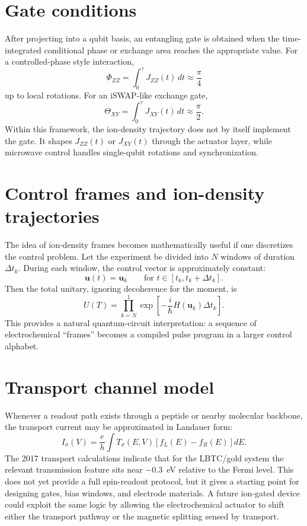\documentclass[11pt]{report}
\newcommand{\lbtc}{LBTC}
\theoremstyle{definition}
\begin{document}
\section{Gate conditions}
After projecting into a qubit basis, an entangling gate is obtained when the time-integrated conditional phase or exchange area reaches the appropriate value. For a controlled-phase style interaction,
\begin{equation}
\Phi_{ZZ} = \int_0^\tau J_{ZZ}(t)\, dt \approx \frac{\pi}{4}
\end{equation}
up to local rotations. For an iSWAP-like exchange gate,
\begin{equation}
\Theta_{XY} = \int_0^\tau J_{XY}(t)\, dt \approx \frac{\pi}{2}.
\end{equation}
Within this framework, the ion-density trajectory does not by itself implement the gate. It shapes $J_{ZZ}(t)$ or $J_{XY}(t)$ through the actuator layer, while microwave control handles single-qubit rotations and synchronization.

\section{Control frames and ion-density trajectories}
The idea of ion-density frames becomes mathematically useful if one discretizes the control problem. Let the experiment be divided into $N$ windows of duration $\Delta t_k$. During each window, the control vector is approximately constant:
\[
\mathbf{u}(t) = \mathbf{u}_k \qquad \text{for } t \in [t_k, t_k+\Delta t_k].
\]
Then the total unitary, ignoring decoherence for the moment, is
\[
U(T) = \prod_{k=N}^{1} \exp\left[-\frac{i}{\hbar}H(\mathbf{u}_k)\Delta t_k\right].
\]
This provides a natural quantum-circuit interpretation: a sequence of electrochemical ``frames'' becomes a compiled pulse program in a larger control alphabet.

\section{Transport channel model}
Whenever a readout path exists through a peptide or nearby molecular backbone, the transport current may be approximated in Landauer form:
\begin{equation}
I_\sigma(V) = \frac{e}{h}\int T_\sigma(E,V)\left[f_L(E)-f_R(E)\right]dE.
\end{equation}
The 2017 transport calculations indicate that for the \lbtc{}/gold system the relevant transmission feature sits near $-0.3$~eV relative to the Fermi level. This does not yet provide a full spin-readout protocol, but it gives a starting point for designing gates, bias windows, and electrode materials. A future ion-gated device could exploit the same logic by allowing the electrochemical actuator to shift either the transport pathway or the magnetic splitting sensed by transport.
\end{document}
